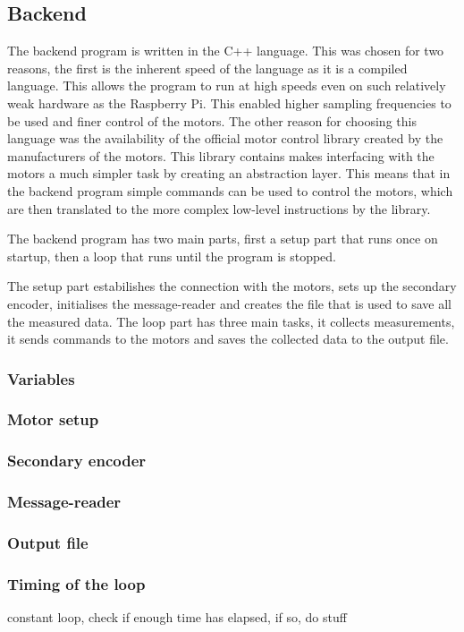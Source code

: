 \documentclass[12pt]{article}
\begin{document}
\subsection{Backend}
The backend program is written in the C++ language. This was chosen for two reasons, the first is the inherent speed of the language as it is a compiled language. This allows the program to run at high speeds even on such relatively weak hardware as the Raspberry Pi. This enabled higher sampling frequencies to be used and finer control of the motors. The other reason for choosing this language was the availability of the official motor control library created by the manufacturers of the motors. This library contains makes interfacing with the motors a much simpler task by creating an abstraction layer. This means that in the backend program simple commands can be used to control the motors, which are then translated to the more complex low-level instructions by the library.

The backend program has two main parts, first a setup part that runs once on startup, then a loop that runs until the program is stopped.

The setup part estabilishes the connection with the motors, sets up the secondary encoder, initialises the message-reader and creates the file that is used to save all the measured data. The loop part has three main tasks, it collects measurements, it sends commands to the motors and saves the collected data to the output file.  

\subsubsection{Variables}
\subsubsection{Motor setup}
\subsubsection{Secondary encoder}
\subsubsection{Message-reader}
\subsubsection{Output file}



\subsubsection{Timing of the loop}
constant loop, check if enough time has elapsed, if so, do stuff
\end{document}
